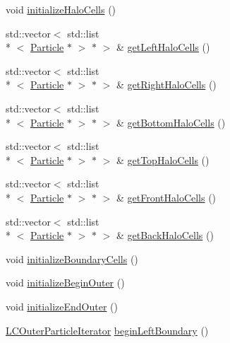 \begin{DoxyCompactItemize}
\item 
void \hyperlink{classutils_1_1LCParticleContainer_ad395a84a4a3cb2c2f5a9f646d68945ef}{initialize\-Halo\-Cells} ()
\item 
std\-::vector$<$ std\-::list\\*
$<$ \hyperlink{classParticle}{Particle} $\ast$ $>$ $\ast$ $>$ \& \hyperlink{classutils_1_1LCParticleContainer_a766d5e02899c5725fdc5a21e83147927}{get\-Left\-Halo\-Cells} ()
\item 
std\-::vector$<$ std\-::list\\*
$<$ \hyperlink{classParticle}{Particle} $\ast$ $>$ $\ast$ $>$ \& \hyperlink{classutils_1_1LCParticleContainer_ad74010f4150519e1a66b82773797c78d}{get\-Right\-Halo\-Cells} ()
\item 
std\-::vector$<$ std\-::list\\*
$<$ \hyperlink{classParticle}{Particle} $\ast$ $>$ $\ast$ $>$ \& \hyperlink{classutils_1_1LCParticleContainer_a5b2cadcc109630a0dbf42c94f57d96db}{get\-Bottom\-Halo\-Cells} ()
\item 
std\-::vector$<$ std\-::list\\*
$<$ \hyperlink{classParticle}{Particle} $\ast$ $>$ $\ast$ $>$ \& \hyperlink{classutils_1_1LCParticleContainer_adc53efc88b1d11386968a98b58397add}{get\-Top\-Halo\-Cells} ()
\item 
std\-::vector$<$ std\-::list\\*
$<$ \hyperlink{classParticle}{Particle} $\ast$ $>$ $\ast$ $>$ \& \hyperlink{classutils_1_1LCParticleContainer_a8e9274cb869e4c5623381f6508f16db1}{get\-Front\-Halo\-Cells} ()
\item 
std\-::vector$<$ std\-::list\\*
$<$ \hyperlink{classParticle}{Particle} $\ast$ $>$ $\ast$ $>$ \& \hyperlink{classutils_1_1LCParticleContainer_ad27215bf92d491180333062982e361a8}{get\-Back\-Halo\-Cells} ()
\item 
void \hyperlink{classutils_1_1LCParticleContainer_ae9b7301ab73920e1ff41e4f8ed7198c3}{initialize\-Boundary\-Cells} ()
\item 
void \hyperlink{classutils_1_1LCParticleContainer_af9141d3030bfcb0fa8e3483ccb53f6e0}{initialize\-Begin\-Outer} ()
\item 
void \hyperlink{classutils_1_1LCParticleContainer_a237632124e4c0c2c6449d0de4a0c33d0}{initialize\-End\-Outer} ()
\item 
\hyperlink{classutils_1_1LCOuterParticleIterator}{L\-C\-Outer\-Particle\-Iterator} \hyperlink{classutils_1_1LCParticleContainer_aca6588d8158b0a65b493db9b575de8f8}{begin\-Left\-Boundary} ()

\end{DoxyCompactItemize}
